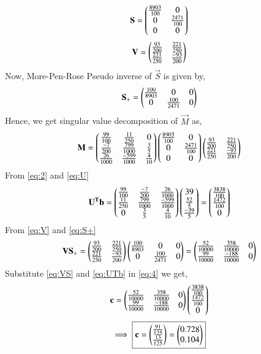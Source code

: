 \documentclass[journal,12pt,twocolumn]{IEEEtran}
\begin{document}
\begin{align}
	 \mathbf{S} = \begin{pmatrix}\frac{8903}{100} & 0 \\ 0 & \frac{2471}{100}  \\ 0 & 0 \end{pmatrix}
\end{align} \label{eq:S}
\begin{align}
	 \mathbf{V} = \begin{pmatrix}\frac{93}{200} & \frac{221}{250} \\ \frac{221}{250} & \frac{-93}{200} \end{pmatrix} \label{eq:V}
\end{align}
Now, More-Pen-Rose Pseudo inverse of $\vec{S}$ is given by,
\begin{align}
	 \mathbf{S_+} = \begin{pmatrix}\frac{100}{8903} & 0 & 0 \\ 0 & \frac{100}{2471} & 0 \end{pmatrix} \label{eq:S+}
\end{align} 
Hence, we get singular value decomposition of $\vec{M}$ as,
\begin{align}
	 \mathbf{M} = \begin{pmatrix}\frac{99}{100} & \frac{11}{250} & 0 \\ \frac{-7}{200} & \frac{799}{1000} & \frac{3}{5} \\ \frac{26}{1000} & \frac{-599}{1000} & \frac{4}{10}\end{pmatrix}\begin{pmatrix}\frac{8903}{100} & 0 \\ 0 & \frac{2471}{100}  \\ 0 & 0\end{pmatrix} \begin{pmatrix}\frac{93}{200} & \frac{221}{250} \\ \frac{221}{250} & \frac{-93}{200} \end{pmatrix}
\end{align}
From \eqref{eq:2} and \eqref{eq:U}
\begin{align}
	 \mathbf{U^Tb} = \begin{pmatrix}\frac{99}{100} & \frac{-7}{200} & \frac{26}{1000} \\ \frac{11}{250} & \frac{799}{1000} & \frac{-599}{1000} \\ 0 & \frac{3}{5} & \frac{4}{10} \end{pmatrix}\begin{pmatrix}39 \\ \frac{52}{5} \\ \frac{-39}{5}\end{pmatrix} = \begin{pmatrix}\frac{3838}{100}\\ \frac{1472}{100}\\ 0\end{pmatrix} \label{eq:UTb}
\end{align}
From \eqref{eq:V} and \eqref{eq:S+}
\begin{align}
	 \mathbf{VS_+} = \begin{pmatrix}\frac{93}{200} & \frac{221}{250} \\ \frac{221}{250} & \frac{-93}{200} \end{pmatrix}\begin{pmatrix}\frac{100}{8903} & 0 & 0 \\ 0 & \frac{100}{2471} & 0 \end{pmatrix} = \begin{pmatrix}\frac{52}{10000} & \frac{358}{10000} & 0 \\ \frac{99}{10000} & \frac{-188}{10000} & 0 \end{pmatrix}\label{eq:VS}
\end{align}
Substitute \eqref{eq:VS} and \eqref{eq:UTb} in \eqref{eq:4} we get,
\begin{align}
	 \mathbf{c} = \begin{pmatrix}\frac{52}{10000} & \frac{358}{10000} & 0 \\ \frac{99}{10000} & \frac{-188}{10000} & 0 \end{pmatrix}\begin{pmatrix}\frac{3838}{100}\\ \frac{1472}{100}\\ 0\end{pmatrix} 
\end{align}
\begin{align}
	\implies \boxed{\mathbf{c} = \begin{pmatrix}\frac{91}{125}\\ \frac{13}{125}\end{pmatrix} =\begin{pmatrix}0.728 \\ 0.104\end{pmatrix} }
\end{align} 
\end{document}
